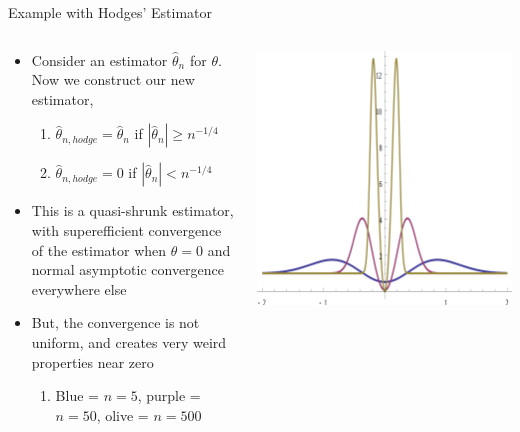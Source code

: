   
  \begin{frame}[allowframebreaks]{Example with Hodges' Estimator}
    \begin{columns}[T] %
      \begin{column}{.6\textwidth}
        \begin{itemize}
        \item Consider an estimator $\hat{\theta}_{n}$ for $\theta$. Now we construct our new estimator,
          \begin{enumerate}[-]
          \item $\hat{\theta}_{n,hodge} = \hat{\theta}_{n}$ if $|\hat{\theta}_{n}|  \geq n^{-1/4}$
          \item $\hat{\theta}_{n,hodge} = 0$ if $|\hat{\theta}_{n}|  < n^{-1/4}$          
          \end{enumerate}
        \item This is a quasi-shrunk estimator, with superefficient
          convergence of the estimator when $\theta = 0$ and normal
          asymptotic convergence everywhere else
        \item But, the convergence is not uniform, and creates very weird properties near zero
          \begin{enumerate}[-]
          \item Blue = $n=5$, purple = $n=50$, olive = $n=500$
          \end{enumerate}
        \end{itemize}
      \end{column}%
    \hfill%
    \begin{column}{.4\textwidth}
      \includegraphics[width=\linewidth]{hodges.png}
    \end{column}
  \end{columns}
  \end{frame}
  
